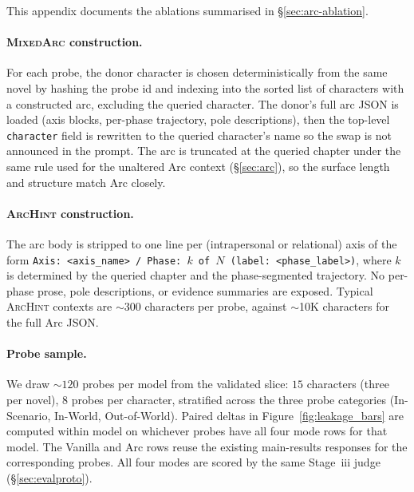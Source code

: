 \documentclass[11pt]{article}
\begin{document}
This appendix documents the ablations summarised in \S\ref{sec:arc-ablation}.

\paragraph{\textsc{MixedArc} construction.}
For each probe, the donor character is chosen deterministically from the same novel by hashing the probe id and indexing into the sorted list of characters with a constructed arc, excluding the queried character. The donor's full arc JSON is loaded (axis blocks, per-phase trajectory, pole descriptions), then the top-level \texttt{character} field is rewritten to the queried character's name so the swap is not announced in the prompt. The arc is truncated at the queried chapter under the same rule used for the unaltered Arc context (\S\ref{sec:arc}), so the surface length and structure match Arc closely.

\paragraph{\textsc{ArcHint} construction.}
The arc body is stripped to one line per (intrapersonal or relational) axis of the form \texttt{Axis: <axis\_name> / Phase: $k$ of $N$ (label: <phase\_label>)}, where $k$ is determined by the queried chapter and the phase-segmented trajectory. No per-phase prose, pole descriptions, or evidence summaries are exposed. Typical \textsc{ArcHint} contexts are $\sim$300 characters per probe, against $\sim$10K characters for the full Arc JSON.

\paragraph{Probe sample.}
We draw $\sim 120$ probes per model from the validated slice: $15$ characters (three per novel), $8$ probes per character, stratified across the three probe categories (In-Scenario, In-World, Out-of-World). Paired deltas in Figure~\ref{fig:leakage_bars} are computed within model on whichever probes have all four mode rows for that model. The Vanilla and Arc rows reuse the existing main-results responses for the corresponding probes. All four modes are scored by the same Stage~iii judge (\S\ref{sec:evalproto}).
\end{document}
